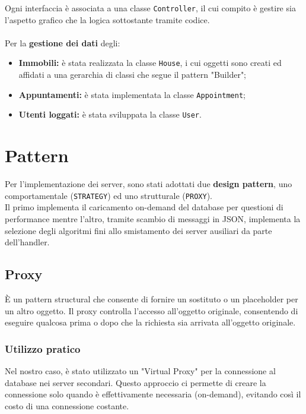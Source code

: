 Ogni interfaccia è associata a una classe \texttt{Controller}, il cui compito è gestire sia l'aspetto grafico che la logica sottostante tramite codice.\\
\\
Per la \textbf{gestione dei dati} degli:
\begin{itemize}
    \item \textbf{Immobili:} è stata realizzata la classe \texttt{House}, i cui oggetti sono creati ed affidati a una gerarchia di classi che segue il pattern "Builder";
    \item \textbf{Appuntamenti:} è stata implementata la classe \texttt{Appointment};
    \item \textbf{Utenti loggati:} è stata sviluppata la classe \texttt{User}.
\end{itemize}

\section{Pattern}

\noindent Per l'implementazione dei server, sono stati adottati due \textbf{design pattern}, uno  comportamentale (\texttt{STRATEGY}) ed uno strutturale (\texttt{PROXY}).\\
Il primo implementa il caricamento on-demand del database per questioni di performance mentre l'altro, tramite scambio di messaggi in JSON, implementa la selezione degli algoritmi fini allo smistamento dei server ausiliari da parte dell'handler.

\subsection{Proxy}

\noindent È un pattern structural che consente di fornire un sostituto o un placeholder per un altro oggetto. Il proxy controlla l'accesso all'oggetto originale, consentendo di eseguire qualcosa prima o dopo che la richiesta sia arrivata all'oggetto originale.

\subsubsection{Utilizzo pratico}
\noindent Nel nostro caso, è stato utilizzato un "Virtual Proxy" per la connessione al database nei server secondari. Questo approccio ci permette di creare la connessione solo quando è effettivamente necessaria (on-demand), evitando così il costo di una connessione costante.

